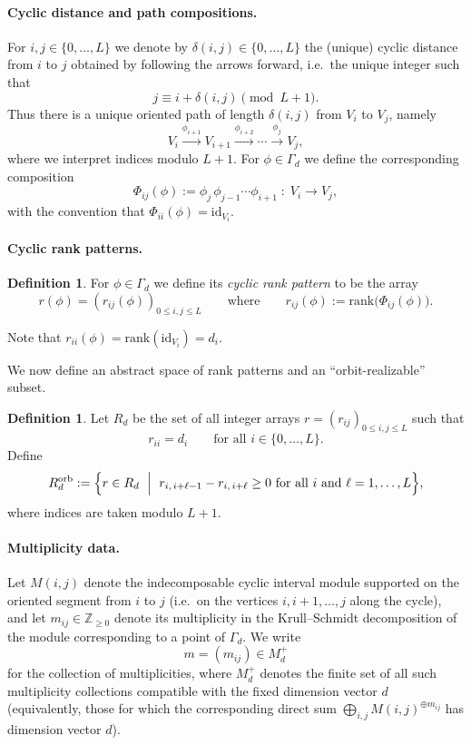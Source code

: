 \documentclass{article}
\theoremstyle{definition}
\newtheorem{definition}[theorem]{Definition}
\begin{document}
\paragraph{Cyclic distance and path compositions.}
For $i,j\in\{0,\dots,L\}$ we denote by $\delta(i,j)\in\{0,\dots,L\}$ the
(unique) cyclic distance from $i$ to $j$ obtained by following the arrows
forward, i.e.\ the unique integer such that
\[
j \equiv i+\delta(i,j) \pmod{L+1}.
\]
Thus there is a unique oriented path of length $\delta(i,j)$ from $V_i$ to $V_j$,
namely
\[
V_i \xrightarrow{\phi_{i+1}} V_{i+1} \xrightarrow{\phi_{i+2}} \cdots
\xrightarrow{\phi_{j}} V_j,
\]
where we interpret indices modulo $L+1$.
For $\phi\in \Gamma_d$ we define the corresponding composition
\begin{equation}\label{eq:Phi-ij}
\Phi_{ij}(\phi)
:=
\phi_{j}\,\phi_{j-1}\cdots \phi_{i+1}
\;:\;
V_i \longrightarrow V_j,
\end{equation}
with the convention that $\Phi_{ii}(\phi)=\mathrm{id}_{V_i}$.

\paragraph{Cyclic rank patterns.}
\begin{definition}\label{def:cyclic-rank-pattern}
For $\phi\in\Gamma_d$ we define its \emph{cyclic rank pattern} to be the array
\[
r(\phi)=(r_{ij}(\phi))_{0\le i,j\le L}
\qquad\text{where}\qquad
r_{ij}(\phi):=\mathrm{rank}\bigl(\Phi_{ij}(\phi)\bigr).
\]
\end{definition}
Note that $r_{ii}(\phi)=\mathrm{rank}(\mathrm{id}_{V_i})=d_i$.

We now define an abstract space of rank patterns and an ``orbit-realizable''
subset.

\begin{definition}\label{def:Rd}
Let $R_d$ be the set of all integer arrays $r=(r_{ij})_{0\le i,j\le L}$
such that
\[
r_{ii}=d_i\qquad\text{for all }i\in\{0,\dots,L\}.
\]
Define
\[
R_d^{\mathrm{orb}}
:=
\Bigl\{
r\in R_d \ \Bigm|\ 
r_{i,\,i+\ell-1}-r_{i,\,i+\ell}\ge 0 \ \text{for all } i\text{ and } \ell=1,\dots,L
\Bigr\},
\]
where indices are taken modulo $L+1$.
\end{definition}

\paragraph{Multiplicity data.}
Let $M(i,j)$ denote the indecomposable cyclic interval module supported on the
oriented segment from $i$ to $j$ (i.e.\ on the vertices
$i,i+1,\dots,j$ along the cycle), and let $m_{ij}\in\mathbb Z_{\ge 0}$
denote its multiplicity in the Krull--Schmidt decomposition of the
module corresponding to a point of $\Gamma_d$.
We write
\[
m=(m_{ij}) \in M_d^+
\]
for the collection of multiplicities, where $M_d^+$ denotes the finite set of
all such multiplicity collections compatible with the fixed dimension vector
$d$ (equivalently, those for which the corresponding direct sum
$\bigoplus_{i,j} M(i,j)^{\oplus m_{ij}}$ has dimension vector $d$).
\end{document}
